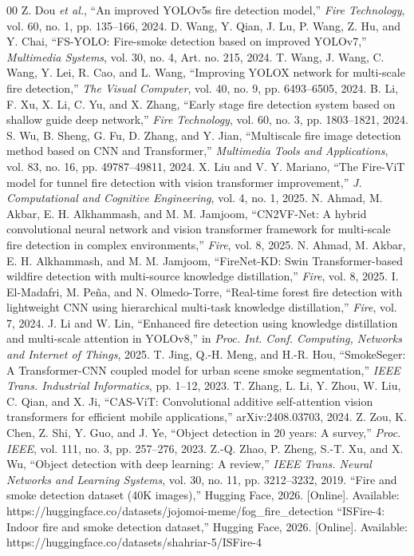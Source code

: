 \documentclass[conference]{IEEEtran}
\begin{document}
\begin{thebibliography}{00}
 Z. Dou \textit{et al.}, ``An improved YOLOv5s fire detection model,'' \textit{Fire Technology}, vol. 60, no. 1, pp. 135--166, 2024.
 D. Wang, Y. Qian, J. Lu, P. Wang, Z. Hu, and Y. Chai, ``FS-YOLO: Fire-smoke detection based on improved YOLOv7,'' \textit{Multimedia Systems}, vol. 30, no. 4, Art. no. 215, 2024.
 T. Wang, J. Wang, C. Wang, Y. Lei, R. Cao, and L. Wang, ``Improving YOLOX network for multi-scale fire detection,'' \textit{The Visual Computer}, vol. 40, no. 9, pp. 6493--6505, 2024.
 B. Li, F. Xu, X. Li, C. Yu, and X. Zhang, ``Early stage fire detection system based on shallow guide deep network,'' \textit{Fire Technology}, vol. 60, no. 3, pp. 1803--1821, 2024.
 S. Wu, B. Sheng, G. Fu, D. Zhang, and Y. Jian, ``Multiscale fire image detection method based on CNN and Transformer,'' \textit{Multimedia Tools and Applications}, vol. 83, no. 16, pp. 49787--49811, 2024.
 X. Liu and V. Y. Mariano, ``The Fire-ViT model for tunnel fire detection with vision transformer improvement,'' \textit{J. Computational and Cognitive Engineering}, vol. 4, no. 1, 2025.
 N. Ahmad, M. Akbar, E. H. Alkhammash, and M. M. Jamjoom, ``CN2VF-Net: A hybrid convolutional neural network and vision transformer framework for multi-scale fire detection in complex environments,'' \textit{Fire}, vol. 8, 2025.
 N. Ahmad, M. Akbar, E. H. Alkhammash, and M. M. Jamjoom, ``FireNet-KD: Swin Transformer-based wildfire detection with multi-source knowledge distillation,'' \textit{Fire}, vol. 8, 2025.
 I. El-Madafri, M. Pe\~na, and N. Olmedo-Torre, ``Real-time forest fire detection with lightweight CNN using hierarchical multi-task knowledge distillation,'' \textit{Fire}, vol. 7, 2024.
 J. Li and W. Lin, ``Enhanced fire detection using knowledge distillation and multi-scale attention in YOLOv8,'' in \textit{Proc. Int. Conf. Computing, Networks and Internet of Things}, 2025.
 T. Jing, Q.-H. Meng, and H.-R. Hou, ``SmokeSeger: A Transformer-CNN coupled model for urban scene smoke segmentation,'' \textit{IEEE Trans. Industrial Informatics}, pp. 1--12, 2023.
 T. Zhang, L. Li, Y. Zhou, W. Liu, C. Qian, and X. Ji, ``CAS-ViT: Convolutional additive self-attention vision transformers for efficient mobile applications,'' arXiv:2408.03703, 2024.
 Z. Zou, K. Chen, Z. Shi, Y. Guo, and J. Ye, ``Object detection in 20 years: A survey,'' \textit{Proc. IEEE}, vol. 111, no. 3, pp. 257--276, 2023.
 Z.-Q. Zhao, P. Zheng, S.-T. Xu, and X. Wu, ``Object detection with deep learning: A review,'' \textit{IEEE Trans. Neural Networks and Learning Systems}, vol. 30, no. 11, pp. 3212--3232, 2019.
 ``Fire and smoke detection dataset (40K images),'' Hugging Face, 2026. [Online]. Available: https://huggingface.co/datasets/jojomoi-meme/fog\_fire\_detection
 ``ISFire-4: Indoor fire and smoke detection dataset,'' Hugging Face, 2026. [Online]. Available: https://huggingface.co/datasets/shahriar-5/ISFire-4
\end{thebibliography}
\end{document}
